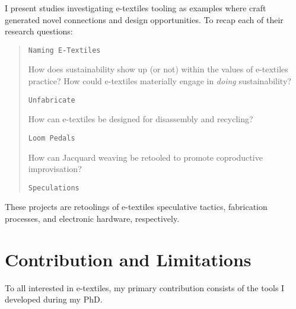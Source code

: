 I present  studies investigating e-textiles tooling as examples where craft generated novel connections and design opportunities. To recap each of their research questions:

\begin{quote}
\texttt{Naming E-Textiles} 

How does sustainability show up (or not) within the values of e-textiles practice? How could e-textiles materially engage in \textit{doing} sustainability?

\vspace{1em}
\texttt{Unfabricate}

How can e-textiles be designed for disassembly and recycling?

\vspace{1em}
\texttt{Loom Pedals}

How can Jacquard weaving be retooled to promote coproductive improvisation?

\vspace{1em}
\texttt{Speculations}

\end{quote}

These projects are retoolings of e-textiles speculative tactics, fabrication processes, and electronic hardware, respectively. 


\section{Contribution and Limitations}


To all interested in e-textiles, my primary contribution consists of the tools I developed during my PhD. 

